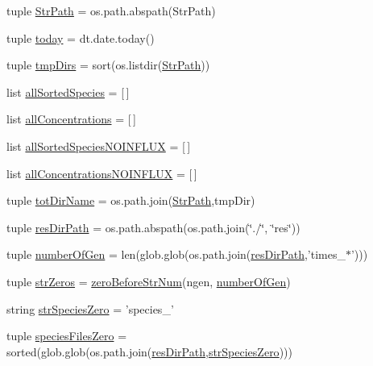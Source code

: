 \begin{DoxyCompactItemize}
\item 
tuple \hyperlink{a00091_a1d168f4d444ea1d02f186a7568344fba}{Str\-Path} = os.\-path.\-abspath(Str\-Path)
\item 
tuple \hyperlink{a00091_af30cd903eabfe4c9167f2a5d0062a4ce}{today} = dt.\-date.\-today()
\item 
tuple \hyperlink{a00091_a4f312756a4e405be853b0a84be7e2e54}{tmp\-Dirs} = sort(os.\-listdir(\hyperlink{a00091_a1d168f4d444ea1d02f186a7568344fba}{Str\-Path}))
\item 
list \hyperlink{a00091_aceddba8afb0eb0cc7ba102491a9a3c30}{all\-Sorted\-Species} = \mbox{[}$\,$\mbox{]}
\item 
list \hyperlink{a00091_a8c439282d32e80d2e2d4c02cc36f1101}{all\-Concentrations} = \mbox{[}$\,$\mbox{]}
\item 
list \hyperlink{a00091_a48013e92108a94a85d1e32c2397eb37c}{all\-Sorted\-Species\-N\-O\-I\-N\-F\-L\-U\-X} = \mbox{[}$\,$\mbox{]}
\item 
list \hyperlink{a00091_af6dd7a5a396717328c091d96d629af7c}{all\-Concentrations\-N\-O\-I\-N\-F\-L\-U\-X} = \mbox{[}$\,$\mbox{]}
\item 
tuple \hyperlink{a00091_aeed4ca0c266fb5e31aebbbbe2f389378}{tot\-Dir\-Name} = os.\-path.\-join(\hyperlink{a00091_a1d168f4d444ea1d02f186a7568344fba}{Str\-Path},tmp\-Dir)
\item 
tuple \hyperlink{a00091_a28ca19f0f566396ef664e068a41a2837}{res\-Dir\-Path} = os.\-path.\-abspath(os.\-path.\-join(\char`\"{}./\char`\"{}, \char`\"{}res\char`\"{}))
\item 
tuple \hyperlink{a00091_a28cc280ff54c726bd790cf781d3bab8c}{number\-Of\-Gen} = len(glob.\-glob(os.\-path.\-join(\hyperlink{a00091_a28ca19f0f566396ef664e068a41a2837}{res\-Dir\-Path},'times\-\_\-$\ast$')))
\item 
tuple \hyperlink{a00091_a9401cc8fb642e77e034e21ef9babcb24}{str\-Zeros} = \hyperlink{a00091_a52efd37e3719214b7a4c7c46842ae229}{zero\-Before\-Str\-Num}(ngen, \hyperlink{a00091_a28cc280ff54c726bd790cf781d3bab8c}{number\-Of\-Gen})
\item 
string \hyperlink{a00091_aea2d717887265b294c623099d2495d4f}{str\-Species\-Zero} = 'species\-\_\-'
\item 
tuple \hyperlink{a00091_a4657fd3a80cf1c76ab075d62d8de3bf3}{species\-Files\-Zero} = sorted(glob.\-glob(os.\-path.\-join(\hyperlink{a00091_a28ca19f0f566396ef664e068a41a2837}{res\-Dir\-Path},\hyperlink{a00091_aea2d717887265b294c623099d2495d4f}{str\-Species\-Zero})))

\end{DoxyCompactItemize}
